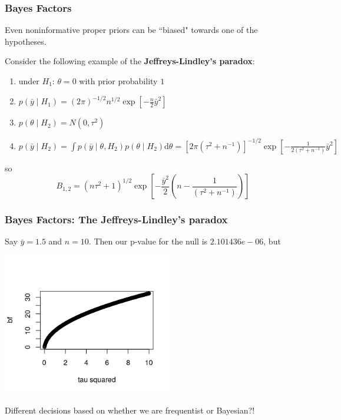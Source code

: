 \documentclass{beamer}
\begin{document}
\begin{frame}
\frametitle{Bayes Factors}

Even noninformative proper priors can be ``biased" towards one of the hypotheses. 
\newline


Consider the following example of the {\bf Jeffreys-Lindley's paradox}:
\begin{enumerate}
\item under $H_1$: $\theta = 0$ with prior probability $1$
\item $p(\bar{y} \mid H_1)  = (2\pi)^{-1/2}n^{1/2} \exp\left[-\frac{n}{2}\bar{y}^2 \right]$
\item $p(\theta \mid H_2 ) = N(0,\tau^2)$
\item $p(\bar{y} \mid H_2) = \int p(\bar{y} \mid \theta, H_2)p(\theta \mid H_2)\text{d}\theta = [2\pi(\tau^2 + n^{-1})]^{-1/2} \exp\left[-\frac{1}{2(\tau^2 + n^{-1})}\bar{y}^2 \right]$
\end{enumerate}
so
\[
B_{1,2} = (n\tau^2 + 1)^{1/2} \exp\left[-\frac{\bar{y}^2}{2}\left(n - \frac{1}{(\tau^2 + n^{-1})}\right) \right]
\]

\end{frame}

\begin{frame}[fragile]
\frametitle{Bayes Factors: The Jeffreys-Lindley's paradox}

Say $\bar{y} = 1.5$ and $n = 10$. Then our p-value for the null is $2.101436e-06$, but 
\begin{center}
\includegraphics[width=75mm]{jf_paradox.png}
\end{center}

Different decisions based on whether we are frequentist or Bayesian?!




\end{frame}
\end{document}
